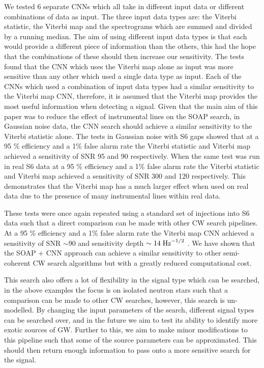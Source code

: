 We tested 6 separate \acp{CNN} which all take in different input data or different combinations of data as input. 
The three input data types are: the Viterbi statistic, the Viterbi map and the spectrograms which are summed and divided by a running median.
The aim of using different input data types is that each would provide a different piece of information than the others, this had the hope that the combinations of these should then increase our sensitivity. 
The tests found that the \ac{CNN} which uses the Viterbi map alone as input was more sensitive than any other which used a single data type as input. 
Each of the \acp{CNN} which used a combination of input data types had a similar sensitivity to the Viterbi map \ac{CNN}, therefore, it is assumed that the Viterbi map provides the most useful information when detecting a signal. 
Given that the main aim of this paper was to reduce the effect of instrumental lines on the SOAP search, in Gaussian noise data, the \ac{CNN} search should achieve a similar sensitivity to the Viterbi statistic alone. 
The tests in Gaussian noise with S6 gaps showed that at a 95 \% efficiency and a 1\% false alarm rate the Viterbi statistic and Viterbi map achieved a sensitivity of SNR 95 and 90 respectively. 
When the same test was run in real S6 data at a 95 \% efficiency and a 1\% false alarm rate the Viterbi statistic and Viterbi map achieved a sensitivity of SNR 300 and 120 respectively.
This demonstrates that the Viterbi map has a much larger effect when used on real data due to the presence of many instrumental lines within real data. 

These tests were once again repeated using a standard set of injections into S6 data such that a direct comparison can be made with other \ac{CW} search pipelines. 
At a 95 \% efficiency and a 1\% false alarm rate the Viterbi map \ac{CNN} achieved a sensitivity of \ac{SNR} $ \sim 90$ and sensitivity depth $\sim 14 \; \rm{Hz}^{-1/2}$ .
We have shown that the SOAP + \ac{CNN} approach can achieve a similar sensitivity to other semi-coherent \ac{CW} search algorithms but with a greatly reduced computational cost.

This search also offers a lot of flexibility in the signal type which can be searched, in the above examples the focus is on isolated neutron stars such that a comparison can be made to other \ac{CW} searches, however, this search is un-modelled. By changing the input parameters of the search, different signal types can be searched over, and in the future we aim to test its ability to identify more exotic sources of \ac{GW}. 
Further to this, we aim to make minor modifications to this pipeline such that some of the source parameters can be approximated. This should then return enough information to pass onto a more sensitive search for the signal. 


